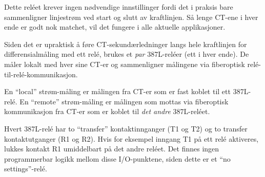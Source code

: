 





Dette reléet krever ingen nødvendige innstillinger fordi det i praksis bare sammenligner linjestrøm ved start og slutt av kraftlinjen. Så lenge CT-ene i hver ende er godt nok matchet, vil det fungere i alle aktuelle applikasjoner.

\vskip 10pt

Siden det er upraktisk å føre CT-sekundærledninger langs hele kraftlinjen for differensialmåling med ett relé, brukes et {\it par} 387L-reléer (ett i hver ende). De måler lokalt med hver sine CT-er og sammenligner målingene via fiberoptisk relé-til-relé-kommunikasjon.

\vskip 10pt

En ``local'' strøm-måling er målingen fra CT-er som er fast koblet til ett 387L-relé. En ``remote'' strøm-måling er målingen som mottas via fiberoptisk kommunikasjon fra CT-er som er koblet til {\it det andre} 387L-reléet.

\vskip 10pt

Hvert 387L-relé har to ``transfer'' kontaktinnganger (T1 og T2) og to transfer kontaktutganger (R1 og R2). Hvis for eksempel inngang T1 på ett relé aktiveres, lukkes kontakt R1 umiddelbart på det andre reléet. Det finnes ingen programmerbar logikk mellom disse I/O-punktene, siden dette er et ``no settings''-relé.


